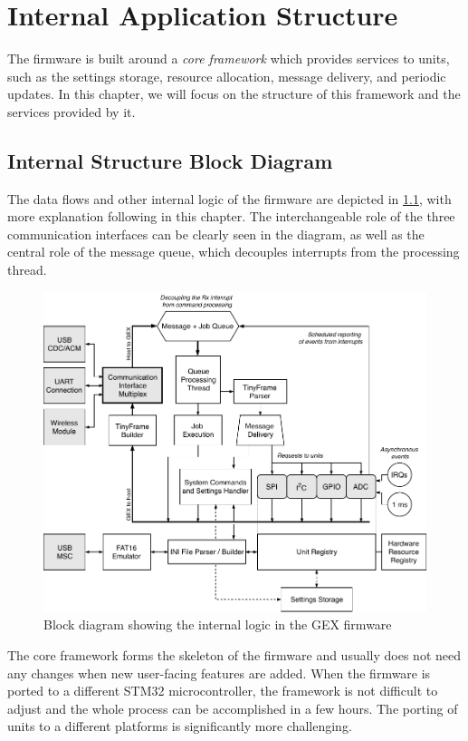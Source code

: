 \chapter{Internal Application Structure} \label{sec:coreframework}

The firmware is built around a \textit{core framework} which provides services to units, such as the settings storage, resource allocation, message delivery, and periodic updates. In this chapter, we will focus on the structure of this framework and the services provided by it.

\section{Internal Structure Block Diagram}

The data flows and other internal logic of the firmware are depicted in \cref{fig:gex-internal}, with more explanation following in this chapter. The interchangeable role of the three communication interfaces can be clearly seen in the diagram, as well as the central role of the message queue, which decouples interrupts from the processing thread.

\begin{figure}[h]
	\centering
	\includegraphics[width=\textwidth] {img/gex-internal.pdf}
	\caption{\label{fig:gex-internal}Block diagram showing the internal logic in the GEX firmware}
\end{figure}

The core framework forms the skeleton of the firmware and usually does not need any changes when new user-facing features are added. When the firmware is ported to a different STM32 microcontroller, the framework is not difficult to adjust and the whole process can be accomplished in a few hours. The porting of units to a different platforms is significantly more challenging.

